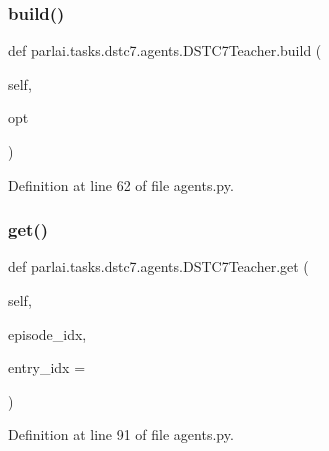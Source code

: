 \subsubsection{\texorpdfstring{build()}{build()}}
{\footnotesize\ttfamily def parlai.\+tasks.\+dstc7.\+agents.\+D\+S\+T\+C7\+Teacher.\+build (\begin{DoxyParamCaption}\item[{}]{self,  }\item[{}]{opt }\end{DoxyParamCaption})}



Definition at line 62 of file agents.\+py.

\mbox{\label{classparlai_1_1tasks_1_1dstc7_1_1agents_1_1DSTC7Teacher_adceeb772d4efa50b44f502d38bdb3049}} 
\subsubsection{\texorpdfstring{get()}{get()}}
{\footnotesize\ttfamily def parlai.\+tasks.\+dstc7.\+agents.\+D\+S\+T\+C7\+Teacher.\+get (\begin{DoxyParamCaption}\item[{}]{self,  }\item[{}]{episode\+\_\+idx,  }\item[{}]{entry\+\_\+idx = {} }\end{DoxyParamCaption})}



Definition at line 91 of file agents.\+py.



